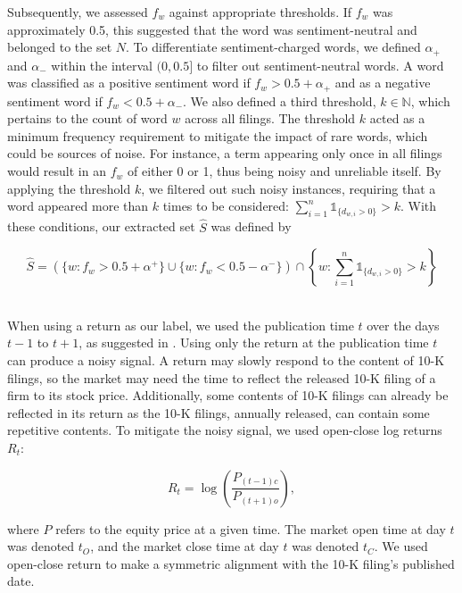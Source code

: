 \documentclass[logo,bsc,singlespacing,parskip]{infthesis}
\begin{document}
Subsequently, we assessed $f_w$ against appropriate thresholds. If $f_w$ was approximately 0.5, this suggested that the word was sentiment-neutral and belonged to the set $N$. To differentiate sentiment-charged words, we defined $\alpha_+$ and $\alpha_-$ within the interval $(0, 0.5]$ to filter out sentiment-neutral words. A word was classified as a positive sentiment word if  $f_w > 0.5+\alpha_+$ and as a negative sentiment word if  $f_w < 0.5+\alpha_-$. We also defined a third threshold, $k \in \mathbb{N}$, which pertains to the count of word $w$ across all filings. The threshold $k$ acted as a minimum frequency requirement to mitigate the impact of rare words, which could be sources of noise. For instance, a term appearing only once in all filings would result in an $f_w$ of either 0 or 1, thus being noisy and unreliable itself. By applying the threshold $k$, we filtered out such noisy instances, requiring that a word appeared more than $k$ times to be considered: ${\sum_{i=1}^{n} \mathbb{1}_{\{d_{w,i}>0\}}} > k$. With these conditions, our extracted set $\hat{S}$ was defined by

\begin{equation} \label{4.3}
\hat{S} = \left( \{w : f_w > 0.5 + \alpha^+\} \cup \{w : f_w < 0.5 - \alpha^-\} \right) \cap \left\{ w : \sum_{i=1}^{n} \mathbb{1}_{\{d_{w,i}>0\}} > k \right\}
\end{equation}

 \\
\label{subsubsubsec:return_calculation}
When using a return as our label, we used the publication time $t$ over the days $t - 1$ to $t +1$, as suggested in \cite{ke2020predicting}. Using only the return at the publication time $t$ can produce a noisy signal. A return may slowly respond to the content of 10-K filings, so the market may need the time to reflect the released 10-K filing of a firm to its stock price. Additionally, some contents of 10-K filings can already be reflected in its return as the 10-K filings, annually released, can contain some repetitive contents. To mitigate the noisy signal, we used open-close log returns
$R_t$:

\begin{equation} \label{4.4}
R_t = \log\left(\frac{P_{(t-1)c}}{P_{(t+1)o}}\right),
\end{equation}

where $P$ refers to the equity price at a given time. The market open time at day $t$ was denoted $t_O$, and the market close time at day $t$ was denoted $t_C$. We used open-close return to make a symmetric alignment with the 10-K filing’s published date.
\end{document}
